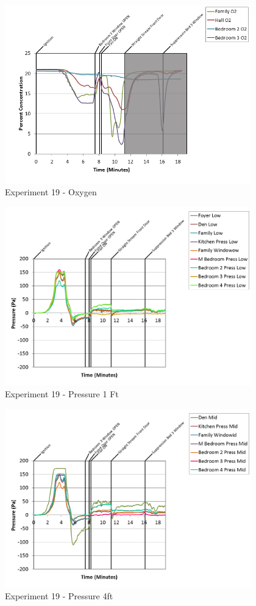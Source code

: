 \documentclass{article}
\begin{document}
\begin{appendices}
\begin{figure}[h!]
	\centering
	\includegraphics[height=3.05in]{0_Images/Results_Charts/Exp_19_Charts/Oxygen.png}
	\caption{Experiment 19 - Oxygen}
\end{figure}

\clearpage

\begin{figure}[h!]
	\centering
	\includegraphics[height=3.05in]{0_Images/Results_Charts/Exp_19_Charts/Pressure1Ft.png}
	\caption{Experiment 19 - Pressure 1 Ft}
\end{figure}


\begin{figure}[h!]
	\centering
	\includegraphics[height=3.05in]{0_Images/Results_Charts/Exp_19_Charts/Pressure4ft.png}
	\caption{Experiment 19 - Pressure 4ft}
\end{figure}


\end{appendices}
\end{document}
